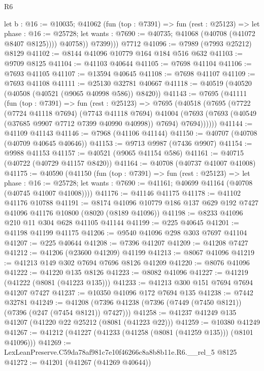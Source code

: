 \begin{lexlean}{R6}
\begin{coremodule}
            let b : @16 := @10035;
            @41062
              (fun (top : @7391) =>
              fun (rest : @25123) =>
              let phase : @16 := @25728;
              let wants : @7690 := @40735; @41068 (@40708 (@41072 @8407 @8125))))
            @40758))
          @7399)))
    @7712
@41096 := @7989 (@7993 @25212) @8129
@41102 := @8144 @41096 @10779 @164 @184 @516 @632
@41103 := @9709 @8125
@41104 := @41103 @40644
@41105 := @7698 @41104
@41106 := @7693 @41105
@41107 := @13594 @40645
@41108 := @7698 @41107
@41109 := @7693 @41108
@41111 := @25130 @32781 @40667
@41118 := @40519 (@40520 (@40508 (@40521 (@9065 @40998 @586)) @8420))
@41143 := @7695
    (@41111
      (fun (top : @7391) =>
      fun (rest : @25123) =>
      @7695
        (@40518
          (@7695
            (@7722
              (@7724 @41118 @7694)
              (@7743 @41118 @7694)
              @41004
              (@7693 (@7693 (@40549 (@37685 @9907 @7712 @7399 @40990 @40998)) @7694) @7694))))))
@41144 := @41109 @41143
@41146 := @7968 (@41106 @41144)
@41150 := @40707 (@40708 (@40709 @40645 @40646))
@41153 := @9713 @9987 (@7436 @9907)
@41154 := @9988 @41153
@41157 := @40521 (@9065 @41154 @586)
@41161 := @40715 (@40722 (@40729 @41157 @8420))
@41164 := @40708 (@40737 @41007 @41008)
@41175 := @40590
    (@41150
      (fun (top : @7391) =>
      fun (rest : @25123) =>
      let phase : @16 := @25728;
      let wants : @7690 := @41161; @40699 @41164 (@40708 (@40745 @41007 @41008))))
@41176 := @41146 @41175
@41178 := @41102 @41176 @10788
@41191 := @8174 @41096 @10779 @186 @137 @629 @192 @7427 @41096 @41176 @10800 (@8020 (@8189 @41096))
@41198 := @8233 @41096 @210 @11 @304 @628 @41105 @41144
@41199 := @225 @40645
@41201 := @41198 @41199 @41175
@41206 := @9540 @41096 @298 @303 @7697 @41104
@41207 := @225 @40644
@41208 := @7396 @41207
@41209 := @41208 @7427
@41212 := @41206 (@23600 @41209) @41199
@41213 := @8067 @41096
@41219 := @41213 @149 @302 @7694 @7696 @8126 @41209
@41220 := @8076 @41096
@41222 := @41220 @135 @8126
@41223 := @8082 @41096
@41227 := @41219 (@41222 (@8081 (@41223 @135)))
@41233 := @41213 @300 @151 @7694 @7694 @41207 @7427
@41237 := @10350 @41096 @172 @7694 @135
@41238 := @7442 @32781
@41249 := @41208 (@7396 @41238 (@7396 (@7449 (@7450 @8121)) (@7396 (@247 (@7454 @8121)) @7427)))
@41258 := @41237 @41249 @135 @41207 (@41220 @22 @25212 (@8081 (@41223 @22)))
@41259 := @10380 @41249
@41267 := @41212 (@41227 (@41233 (@41258 (@8081 (@41259 @135))) (@8101 @41096)))
@41269 := LexLeanPreserve.C59da78af981c7e10f46266c8a8b8b11e.R6.__rel_5 @8125
@41272 := @41201 (@41267 (@41269 @40644))

\end{coremodule}
\end{lexlean}
